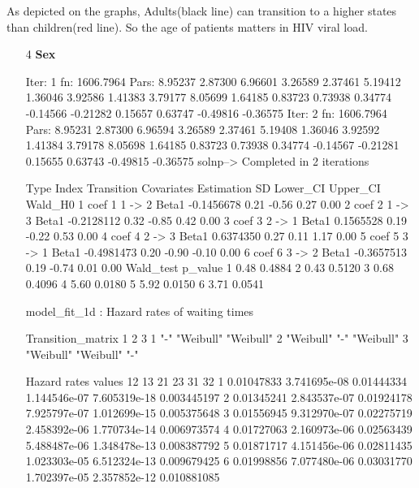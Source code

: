 \documentclass[11pt,a4paper]{article}
\begin{document}
As depicted on the graphs, Adults(black line) can transition to a higher states than children(red line). So the age of patients matters in HIV viral load.\\
\begin{enumerate}
  \item[4] \textbf{Sex}
\begin{Schunk}
\begin{Soutput}
Iter: 1 fn: 1606.7964	 Pars:   8.95237  2.87300  6.96601  3.26589  2.37461  5.19412  1.36046  3.92586  1.41383  3.79177  8.05699  1.64185  0.83723  0.73938  0.34774 -0.14566 -0.21282  0.15657  0.63747 -0.49816 -0.36575
Iter: 2 fn: 1606.7964	 Pars:   8.95231  2.87300  6.96594  3.26589  2.37461  5.19408  1.36046  3.92592  1.41384  3.79178  8.05698  1.64185  0.83723  0.73938  0.34774 -0.14567 -0.21281  0.15655  0.63743 -0.49815 -0.36575
solnp--> Completed in 2 iterations
\end{Soutput}
\begin{Soutput}
  Type Index Transition Covariates Estimation   SD Lower_CI Upper_CI Wald_H0
1 coef     1     1 -> 2      Beta1 -0.1456678 0.21    -0.56     0.27    0.00
2 coef     2     1 -> 3      Beta1 -0.2128112 0.32    -0.85     0.42    0.00
3 coef     3     2 -> 1      Beta1  0.1565528 0.19    -0.22     0.53    0.00
4 coef     4     2 -> 3      Beta1  0.6374350 0.27     0.11     1.17    0.00
5 coef     5     3 -> 1      Beta1 -0.4981473 0.20    -0.90    -0.10    0.00
6 coef     6     3 -> 2      Beta1 -0.3657513 0.19    -0.74     0.01    0.00
  Wald_test p_value
1      0.48  0.4884
2      0.43  0.5120
3      0.68  0.4096
4      5.60  0.0180
5      5.92  0.0150
6      3.71  0.0541
\end{Soutput}
\begin{Soutput}
model_fit_1d  : Hazard rates of waiting times

Transition_matrix
  1         2         3        
1 "-"       "Weibull" "Weibull"
2 "Weibull" "-"       "Weibull"
3 "Weibull" "Weibull" "-"      

Hazard rates values 
          12           13         21           23           31          32
1 0.01047833 3.741695e-08 0.01444334 1.144546e-07 7.605319e-18 0.003445197
2 0.01345241 2.843537e-07 0.01924178 7.925797e-07 1.012699e-15 0.005375648
3 0.01556945 9.312970e-07 0.02275719 2.458392e-06 1.770734e-14 0.006973574
4 0.01727063 2.160973e-06 0.02563439 5.488487e-06 1.348478e-13 0.008387792
5 0.01871717 4.151456e-06 0.02811435 1.023303e-05 6.512324e-13 0.009679425
6 0.01998856 7.077480e-06 0.03031770 1.702397e-05 2.357852e-12 0.010881085


\end{Soutput}
\end{Schunk}
\end{enumerate}
\end{document}
